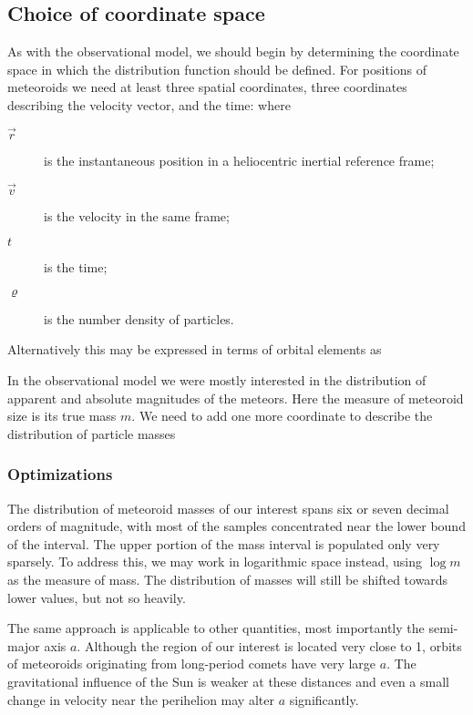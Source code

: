     \subsection{Choice of coordinate space} \label{moc}
        As with the observational model, we should begin by determining the coordinate space
        in which the distribution function should be defined. For positions of meteoroids we need at least
        three spatial coordinates, three coordinates describing the velocity vector, and the time:
        where
        \begin{description}
            \item[$\vec{r}$]    is the instantaneous position in a heliocentric inertial reference frame;
            \item[$\vec{v}$]    is the velocity in the same frame;
            \item[$t$]          is the time;
            \item[$\varrho$]    is the number density of particles.
        \end{description}

        Alternatively this may be expressed in terms of orbital elements as

        In the observational model we were mostly interested in the distribution of apparent and absolute
        magnitudes of the meteors. Here the measure of meteoroid size is its true mass $m$.
        We need to add one more coordinate to describe the distribution of particle masses

        \subsubsection{Optimizations} \label{moco}
            The distribution of meteoroid masses of our interest spans six or seven decimal orders of magnitude,
            with most of the samples concentrated near the lower bound of the interval.
            The upper portion of the mass interval is populated only very sparsely.
            To address this, we may work in logarithmic space instead, using $\log m$ as the measure of mass.
            The distribution of masses will still be shifted towards lower values, but not so heavily.

            The same approach is applicable to other quantities, most importantly the semi-major axis $a$.
            Although the region of our interest is located very close to \SI{1}{\au},
            orbits of meteoroids originating from long-period comets have very large $a$.
            The gravitational influence of the Sun is weaker at these distances and
            even a small change in velocity near the perihelion may alter $a$ significantly.

